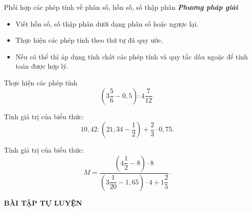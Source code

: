 \setcounter{vd}{0}
\begin{dang}{Phối hợp các phép tính về phân số, hỗn số, số thập phân}
\textbf{\textit{Phương pháp giải}}
\begin{itemize}
\item Viết hỗn số, số thập phân dưới dạng phân số hoặc ngược lại.
\item Thực hiện các phép tính theo thứ tự đã quy ước.
\item Nếu có thể thì áp dụng tính chất các phép tính và quy tắc dấu ngoặc để tính toán được hợp lý.
\end{itemize}
\end{dang}
\begin{vd} %
Thực hiện các phép tính\\
$$\left(3\dfrac{5}{6} - 0{,}5\right) : 4\dfrac{7}{12}.$$
\end{vd}
\begin{vd} %
Tính giá trị của biểu thức:\\
$$10{,}42:\left(21{,}34-\dfrac{1}{2}\right)+\dfrac{2}{3}\cdot0{,}75.$$
\end{vd}
\begin{vd} %
Tính giá trị của biểu thức:\\
$$M = \dfrac{\left(4\dfrac{1}{2}-8\right)\cdot8}{\left(3\dfrac{1}{20}-1{,}65\right)\cdot4+1\dfrac{2}{5}}.$$
\end{vd}
\begin{center}
\textbf{BÀI TẬP TỰ LUYỆN }
\end{center}
